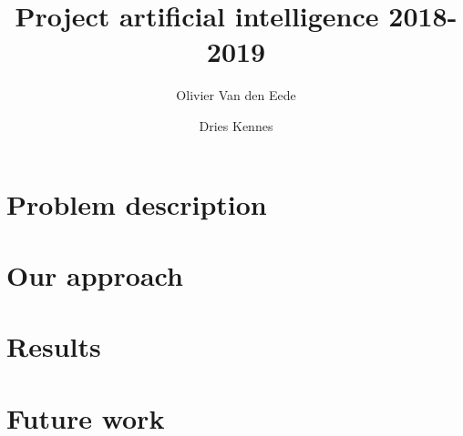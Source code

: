 \documentclass[11pt]{article}
\begin{document}
\title{Project artificial intelligence 2018-2019}
\author[1]{Olivier Van den Eede}
\author[1]{Dries Kennes}
\date{}
\maketitle

\section{Problem description}

\section{Our approach}

\section{Results}

\section{Future work}
\end{document}

